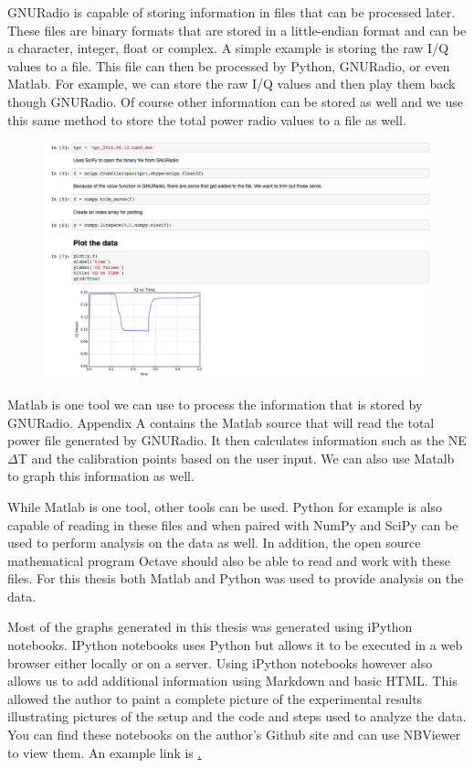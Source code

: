 GNURadio is capable of storing information in files that can be processed later.  These files are binary formats that are stored in a little-endian format and can be a character, integer, float or complex.  A simple example is storing the raw I/Q values to a file.  This file can then be processed by Python, GNURadio, or even Matlab.  For example, we can store the raw I/Q values and then play them back though GNURadio.  Of course other information can be stored as well and we use this same method to store the total power radio values to a file as well.  

{\begin{figure}[h!tb] 
\centering
\includegraphics[width=17cm]{Images/python_gnuradio.png}
\label{matlab_display}
\end{figure}
}

Matlab is one tool we can use to process the information that is stored by GNURadio.  Appendix A contains the Matlab source that will read the total power file generated by GNURadio.  It then calculates information such as the NE$\Delta$T and the calibration points based on the user input.  We can also use Matalb to graph this information as well.

While Matlab is one tool, other tools can be used.  Python for example is also capable of reading in these files and when paired with NumPy and SciPy can be used to perform analysis on the data as well.  In addition, the open source mathematical program Octave should also be able to read and work with these files.  For this thesis both Matlab and Python was used to provide analysis on the data.  

Most of the graphs generated in this thesis was generated using iPython notebooks.  IPython notebooks uses Python but allows it to be executed in a web browser either locally or on a server.  Using iPython notebooks however also allows us to add additional information using Markdown and basic HTML.  This allowed the author to paint a complete picture of the experimental results illustrating pictures of the setup and the code and steps used to analyze the data.  You can find these notebooks on the author's Github site and can use NBViewer to view them.  An example link is \href{http://nbviewer.ipython.org/github/matgyver/Radiometer-SDR-Thesis/blob/master/Experiments/Exp1/radiometer_experiment_1.ipynb}.
